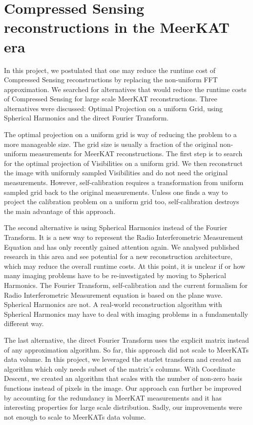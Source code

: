 \section{Compressed Sensing reconstructions in the MeerKAT era}
In this project, we postulated that one may reduce the runtime cost of Compressed Sensing reconstructions by replacing the non-uniform FFT approximation. We searched for alternatives that would reduce the runtime costs of Compressed Sensing for large scale MeerKAT reconstructions. Three alternatives were discussed: Optimal Projection on a uniform Grid, using Spherical Harmonics and the direct Fourier Transform.

The optimal projection on a uniform grid is way of reducing the problem to a more manageable size. The grid size is usually a fraction of the original non-uniform measurements for MeerKAT reconstructions. The first step is to search for the optimal projection of Visibilities on a uniform grid. We then reconstruct the image with uniformly sampled Visibilities and do not need the original measurements. However, self-calibration requires a transformation from uniform sampled grid back to the original measurements. Unless one finds a way to project the calibration problem on a uniform grid too, self-calibration destroys the main advantage of this approach.

The second alternative is using Spherical Harmonics instead of the Fourier Transform. It is a new way to represent the Radio Interferometric Measurement Equation and has only recently gained attention again. We analysed published research in this area\cite{carozzi2015imaging, mcewen2008simulating} and see potential for a new reconstruction architecture, which may reduce the overall runtime costs. At this point, it is unclear if or how many imaging problems have to be re-investigated by moving to Spherical Harmonics. The Fourier Transform, self-calibration and the current formalism for Radio Interferometric Measurement equation is based on the plane wave\cite{smirnov2011revisiting}. Spherical Harmonics are not. A real-world reconstruction algorithm with Spherical Harmonics may have to deal with imaging problems in a fundamentally different way.

The last alternative, the direct Fourier Transform uses the explicit matrix instead of any approximation algorithm. So far, this approach did not scale to MeerKATs data volume. In this project, we leveraged the starlet transform and created an algorithm which only needs subset of the matrix's columns. With Coordinate Descent, we created an algorithm that scales with the number of non-zero basis functions instead of pixels in the image. Our approach can further be improved by accounting for the redundancy in MeerKAT measurements and it has interesting properties for large scale distribution. Sadly, our improvements were not enough to scale to MeerKATs data volume. 

